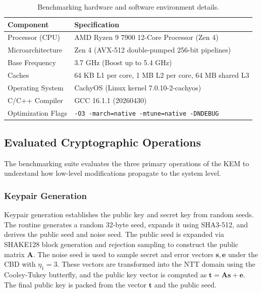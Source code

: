 \begin{table}[htbp]
    \centering
    \caption{Benchmarking hardware and software environment details. }
    \label{tab:bench_env}
    \begin{tabular}{ll}
        \toprule
        Component & Specification \\
        \midrule
        Processor (CPU) & AMD Ryzen 9 7900 12-Core Processor (Zen 4) \\
        Microarchitecture & Zen 4 (AVX-512 double-pumped 256-bit pipelines) \\
        Base Frequency & 3.7 GHz (Boost up to 5.4 GHz) \\
        Caches & 64 KB L1 per core, 1 MB L2 per core, 64 MB shared L3 \\
        Operating System & CachyOS (Linux kernel 7.0.10-2-cachyos) \\
        C/C++ Compiler & GCC 16.1.1 (20260430) \\
        Optimization Flags & \texttt{-O3 -march=native -mtune=native -DNDEBUG} \\
        \bottomrule
    \end{tabular}
\end{table}

\subsection{Evaluated Cryptographic Operations}
\label{sub:cryptographic_ops}

The benchmarking suite evaluates the three primary operations of the KEM to understand how low-level modifications propagate to the system level.

\subsubsection{Keypair Generation}
Keypair generation establishes the public key and secret key from random seeds. The routine generates a random 32-byte seed, expands it using SHA3-512, and derives the public seed and noise seed. The public seed is expanded via SHAKE128 block generation and rejection sampling to construct the public matrix $\mathbf{A}$. The noise seed is used to sample secret and error vectors $\mathbf{s}, \mathbf{e}$ under the CBD with $\eta_1 = 3$. These vectors are transformed into the NTT domain using the Cooley-Tukey butterfly, and the public key vector is computed as $\mathbf{t} = \mathbf{A}\mathbf{s} + \mathbf{e}$. The final public key is packed from the vector $\mathbf{t}$ and the public seed.

